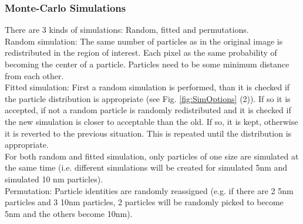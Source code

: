 \documentclass[12pt, a4paper]{scrartcl}
\begin{document}
\subsubsection{Monte-Carlo Simulations}
\label{m:simulations}
There are 3 kinds of simulations: Random, fitted and permutations. \\ Random simulation: The same number of particles as in the original image is redistributed in the region of interest. Each pixel as the same probability of becoming the center of a particle. Particles need to be some minimum distance from each other. \\ Fitted simulation: First a random simulation is performed, than it is checked if the particle distribution is appropriate (see Fig. \ref{fig:SimOptions} (2)). If so it is accepted, if not a random particle is randomly redistributed and it is checked if the new simulation is closer to acceptable than the old. If so, it is kept, otherwise it is reverted to the previous situation. This is repeated until the distribution is appropriate. \\ For both random and fitted simulation, only particles of one size are simulated at the same time (i.e. different simulations will be created for simulated 5nm and simulated 10 nm particles). \\ Permutation: Particle identities are randomly reassigned (e.g. if there are 2 5nm particles and 3 10nm particles, 2 particles will be randomly picked to become 5nm and the others become 10nm).
\end{document}
